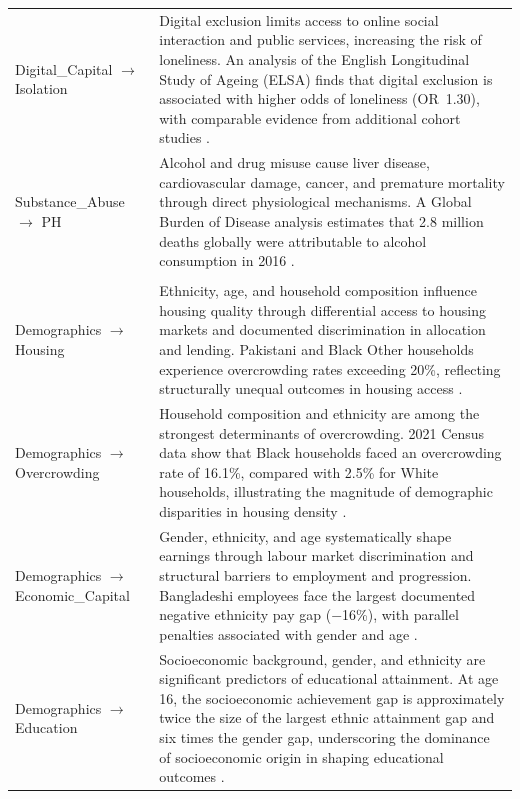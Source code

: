 \begin{longtable}{@{}p{3.8cm}p{11.2cm}@{}}
\addlinespace
Digital\_Capital $\to$ Isolation
& Digital exclusion limits access to online social interaction and public services, increasing the risk of loneliness. An analysis of the English Longitudinal Study of Ageing (ELSA) finds that digital exclusion is associated with higher odds of loneliness (OR~1.30), with comparable evidence from additional cohort studies \citep{zhong_digital_2025, yan_association_2024}. \\
\addlinespace
Substance\_Abuse $\to$ PH
& Alcohol and drug misuse cause liver disease, cardiovascular damage, cancer, and premature mortality through direct physiological mechanisms. A Global Burden of Disease analysis estimates that 2.8 million deaths globally were attributable to alcohol consumption in 2016 \citep{gbd_2016_alcohol_collaborators_alcohol_2018}. \\
\addlinespace
\multicolumn{2}{@{}l}{\textit{Demographics outgoing edges}}\\
\addlinespace
Demographics $\to$ Housing
& Ethnicity, age, and household composition influence housing quality through differential access to housing markets and documented discrimination in allocation and lending. Pakistani and Black Other households experience overcrowding rates exceeding 20\%, reflecting structurally unequal outcomes in housing access \citep{resolution_foundation_heritage_2025, brimblecombe_mapping_2024}. \\
\addlinespace
Demographics $\to$ Overcrowding
& Household composition and ethnicity are among the strongest determinants of overcrowding. 2021 Census data show that Black households faced an overcrowding rate of 16.1\%, compared with 2.5\% for White households, illustrating the magnitude of demographic disparities in housing density \citep{office_for_national_statistics_overcrowding_2023, dezateux_inequalities_2025}. \\
\addlinespace
Demographics $\to$ Economic\_Capital
& Gender, ethnicity, and age systematically shape earnings through labour market discrimination and structural barriers to employment and progression. Bangladeshi employees face the largest documented negative ethnicity pay gap ($-$16\%), with parallel penalties associated with gender and age \citep{briggs_understanding_2020, office_for_national_statistics_ethnicity_2023, goldin_understanding_1992}. \\
\addlinespace
Demographics $\to$ Education
& Socioeconomic background, gender, and ethnicity are significant predictors of educational attainment. At age 16, the socioeconomic achievement gap is approximately twice the size of the largest ethnic attainment gap and six times the gender gap, underscoring the dominance of socioeconomic origin in shaping educational outcomes \citep{strand_ethnicity_2014, li_entrenched_2021}. \\
\end{longtable}

